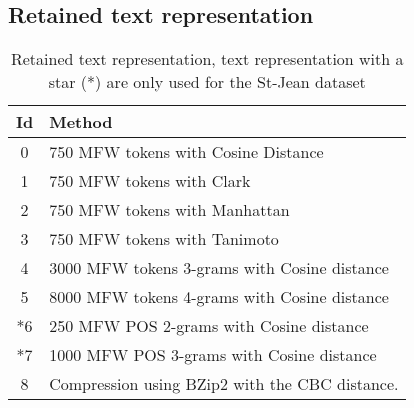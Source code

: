 \newpage
\subsection{Retained text representation}
\label{sec:annex_retained_text_representation}

\begin{table}[H]
  \centering
  \caption{Retained text representation, text representation with a star (*) are only used for the St-Jean dataset}
  \label{tab:9rl}
  \begin{tabular}{c l}
    \toprule
    Id &
    Method \\
    \midrule
    0 & 750 MFW tokens with Cosine Distance \\
    1 & 750 MFW tokens with Clark \\
    2 & 750 MFW tokens with Manhattan \\
    3 & 750 MFW tokens with Tanimoto \\
    4 & 3000 MFW tokens 3-grams with Cosine distance \\
    5 & 8000 MFW tokens 4-grams with Cosine distance \\
    *6 & 250 MFW POS 2-grams with Cosine distance \\
    *7 & 1000 MFW POS 3-grams with Cosine distance \\
    8 & Compression using BZip2 with the CBC distance. \\
    \bottomrule
  \end{tabular}
\end{table}

